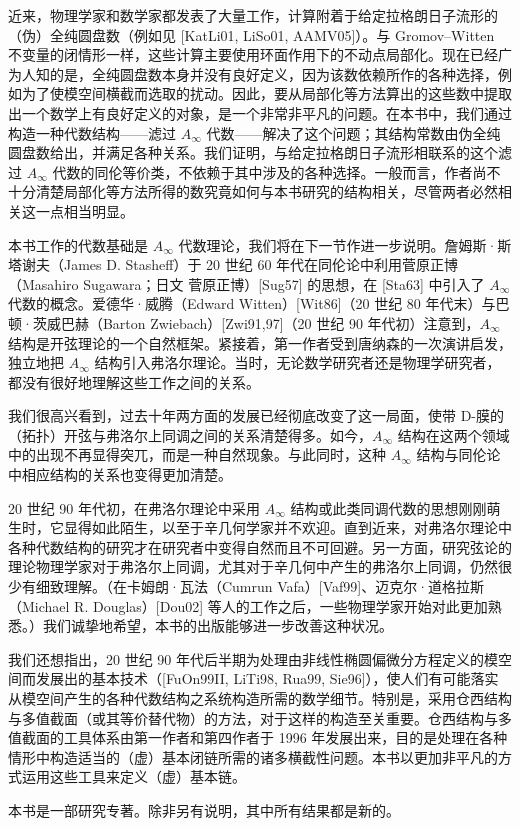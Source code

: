 近来，物理学家和数学家都发表了大量工作，计算附着于给定拉格朗日子流形的（伪）全纯圆盘数（例如见 [KatLi01, LiSo01, AAMV05]）。与 Gromov--Witten 不变量的闭情形一样，这些计算主要使用环面作用下的不动点局部化。现在已经广为人知的是，全纯圆盘数本身并没有良好定义，因为该数依赖所作的各种选择，例如为了使模空间横截而选取的扰动。因此，要从局部化等方法算出的这些数中提取出一个数学上有良好定义的对象，是一个非常非平凡的问题。在本书中，我们通过构造一种代数结构——滤过 $A_\infty$ 代数——解决了这个问题；其结构常数由伪全纯圆盘数给出，并满足各种关系。我们证明，与给定拉格朗日子流形相联系的这个滤过 $A_\infty$ 代数的同伦等价类，不依赖于其中涉及的各种选择。一般而言，作者尚不十分清楚局部化等方法所得的数究竟如何与本书研究的结构相关，尽管两者必然相关这一点相当明显。

本书工作的代数基础是 $A_\infty$ 代数理论，我们将在下一节作进一步说明。詹姆斯·斯塔谢夫（James D. Stasheff）于 20 世纪 60 年代在同伦论中利用菅原正博（Masahiro Sugawara；日文 菅原正博）[Sug57] 的思想，在 [Sta63] 中引入了 $A_\infty$ 代数的概念。爱德华·威腾（Edward Witten）[Wit86]（20 世纪 80 年代末）与巴顿·茨威巴赫（Barton Zwiebach）[Zwi91,97]（20 世纪 90 年代初）注意到，$A_\infty$ 结构是开弦理论的一个自然框架。紧接着，第一作者受到唐纳森的一次演讲启发，独立地把 $A_\infty$ 结构引入弗洛尔理论。当时，无论数学研究者还是物理学研究者，都没有很好地理解这些工作之间的关系。

我们很高兴看到，过去十年两方面的发展已经彻底改变了这一局面，使带 D-膜的（拓扑）开弦与弗洛尔上同调之间的关系清楚得多。如今，$A_\infty$ 结构在这两个领域中的出现不再显得突兀，而是一种自然现象。与此同时，这种 $A_\infty$ 结构与同伦论中相应结构的关系也变得更加清楚。

20 世纪 90 年代初，在弗洛尔理论中采用 $A_\infty$ 结构或此类同调代数的思想刚刚萌生时，它显得如此陌生，以至于辛几何学家并不欢迎。直到近来，对弗洛尔理论中各种代数结构的研究才在研究者中变得自然而且不可回避。另一方面，研究弦论的理论物理学家对于弗洛尔上同调，尤其对于辛几何中产生的弗洛尔上同调，仍然很少有细致理解。（在卡姆朗·瓦法（Cumrun Vafa）[Vaf99]、迈克尔·道格拉斯（Michael R. Douglas）[Dou02] 等人的工作之后，一些物理学家开始对此更加熟悉。）我们诚挚地希望，本书的出版能够进一步改善这种状况。

我们还想指出，20 世纪 90 年代后半期为处理由非线性椭圆偏微分方程定义的模空间而发展出的基本技术（[FuOn99II, LiTi98, Rua99, Sie96]），使人们有可能落实从模空间产生的各种代数结构之系统构造所需的数学细节。特别是，采用仓西结构与多值截面（或其等价替代物）的方法，对于这样的构造至关重要。仓西结构与多值截面的工具体系由第一作者和第四作者于 1996 年发展出来，目的是处理在各种情形中构造适当的（虚）基本闭链所需的诸多横截性问题。本书以更加非平凡的方式运用这些工具来定义（虚）基本链。

本书是一部研究专著。除非另有说明，其中所有结果都是新的。
